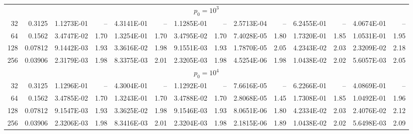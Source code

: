 \begin{tabular}{rrrrrrrrrrrrrr}
\multicolumn{14}{c}{$p_0=10^{3}$} \\
32 & 0.3125 & 1.1273E-01 & -- & 4.3141E-01 & -- & 1.1285E-01 & -- & 2.5713E-04 & -- & 6.2455E-01 & -- & 4.0674E-01 & -- \\
64 & 0.1562 & 3.4747E-02 & 1.70 & 1.3254E-01 & 1.70 & 3.4795E-02 & 1.70 & 7.4028E-05 & 1.80 & 1.7320E-01 & 1.85 & 1.0531E-01 & 1.95 \\
128 & 0.07812 & 9.1442E-03 & 1.93 & 3.3616E-02 & 1.98 & 9.1551E-03 & 1.93 & 1.7870E-05 & 2.05 & 4.2343E-02 & 2.03 & 2.3209E-02 & 2.18 \\
256 & 0.03906 & 2.3179E-03 & 1.98 & 8.3375E-03 & 2.01 & 2.3205E-03 & 1.98 & 4.5254E-06 & 1.98 & 1.0438E-02 & 2.02 & 5.6057E-03 & 2.05 \\
\multicolumn{14}{c}{$p_0=10^{4}$} \\
32 & 0.3125 & 1.1296E-01 & -- & 4.3004E-01 & -- & 1.1292E-01 & -- & 7.6616E-05 & -- & 6.2266E-01 & -- & 4.0869E-01 & -- \\
64 & 0.1562 & 3.4785E-02 & 1.70 & 1.3243E-01 & 1.70 & 3.4788E-02 & 1.70 & 2.8068E-05 & 1.45 & 1.7308E-01 & 1.85 & 1.0492E-01 & 1.96 \\
128 & 0.07812 & 9.1547E-03 & 1.93 & 3.3625E-02 & 1.98 & 9.1546E-03 & 1.93 & 8.0651E-06 & 1.80 & 4.2334E-02 & 2.03 & 2.4076E-02 & 2.12 \\
256 & 0.03906 & 2.3206E-03 & 1.98 & 8.3416E-03 & 2.01 & 2.3204E-03 & 1.98 & 2.1815E-06 & 1.89 & 1.0438E-02 & 2.02 & 5.6498E-03 & 2.09 \\
\hline
\end{tabular}
